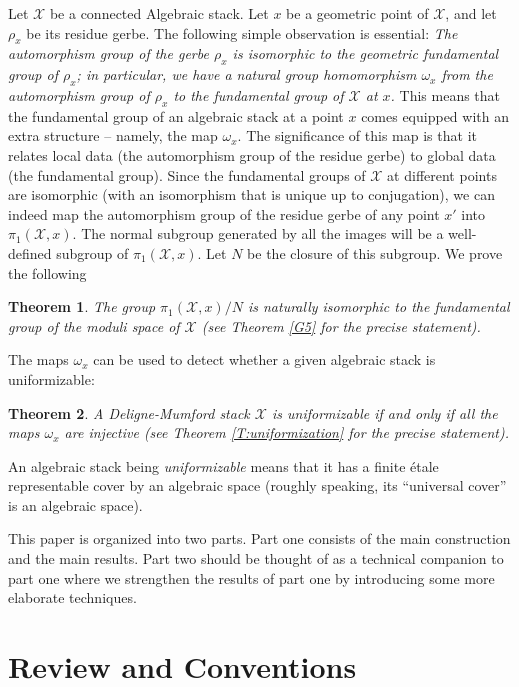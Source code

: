 \documentclass{amsart}
\newtheorem{thm}{Theorem}[section]
\theoremstyle{definition}
\theoremstyle{remark}
\theoremstyle{remark}
\newcommand{\X}{\mathcal{X}}
\newcommand{\ox}{\omega_x}
\newcommand{\pX}{\pi_1(\X,x)}
\begin{document}
Let $\X$ be a connected Algebraic stack. Let $x$ be a geometric
point of $\X$, and let $\rho_x$ be its residue gerbe.
 The following simple observation is essential:
 {\em The automorphism group of the gerbe $\rho_x$ is isomorphic
 to the geometric fundamental group
of $\rho_x$; in particular, we have a natural group homomorphism
$\ox$ from the automorphism group of $\rho_x$ to the fundamental
group of $\X$ at $x$.} This means that the fundamental group of an
algebraic stack at a point $x$ comes equipped with an extra
structure -- namely, the map $\ox$. The significance of this map
is that it relates local data (the automorphism group of the
residue gerbe) to global data (the fundamental group). Since the
fundamental groups of $\X$ at different points are isomorphic
(with an isomorphism that is unique up to conjugation), we can
indeed map the automorphism group of the residue gerbe of any
point $x'$ into $\pX$. The normal subgroup generated by all the
images will be a well-defined subgroup of $\pX$. Let $N$ be the
closure of this subgroup. We prove the following

\begin{thm}
The group $\pX/N$ is naturally isomorphic to the fundamental group
of the moduli space of $\X$ (see Theorem \ref{G5} for the precise
statement).
\end{thm}

The maps $\ox$ can be used to detect whether a given algebraic
stack is uniformizable:

\begin{thm}
A Deligne-Mumford stack $\X$ is uniformizable if and only if all
the maps $\ox$ are injective (see Theorem \ref{T:uniformization}
for the precise statement).
\end{thm}

An algebraic stack being {\em uniformizable} means that it has a
finite \'{e}tale representable cover by an algebraic space
(roughly speaking, its ``universal cover'' is an algebraic space).


This paper is organized into two parts. Part one consists of the
main construction and the main results. Part two should be thought
of as a technical companion to part one where we   strengthen the
results of part one by introducing some more elaborate techniques.

\tableofcontents


\section{Review and Conventions}{\label{S:review}}
\end{document}
